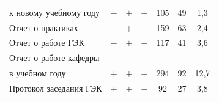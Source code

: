 \begin{table}
\begin{center}
\begin{tabular}{|l|c|c|c|c|c|c|}
к новому учебному году&$-$&$+$&$-$&105&49&\hphantom{9}1,3\\


Отчет о практиках&$-$&+&$-$&159&63&\hphantom{9}2,4\\


Отчет о работе ГЭК&$-$&$+$&$-$&117&41&\hphantom{9}3,6\\


Отчет о работе кафедры&&&&&&\\


 в учебном году&$+$&$+$&$-$&294&92&12,7\\


Протокол заседания ГЭК&$+$&$+$&$-$&\hphantom{9}92&27&\hphantom{9}3,8\\


\hline


\end{tabular}


\end{center}


\vspace*{12pt}


\end{table}





